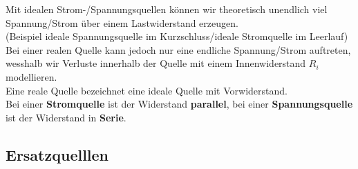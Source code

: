 										\iend


										Mit idealen Strom-/Spannungsquellen können wir theoretisch unendlich viel Spannung/Strom über einem Lastwiderstand erzeugen. \\
										(Beispiel ideale Spannungsquelle im Kurzschluss/ideale Stromquelle im Leerlauf) \\
										Bei einer realen Quelle kann jedoch nur eine endliche Spannung/Strom auftreten, wesshalb wir Verluste innerhalb der Quelle mit einem Innenwiderstand $R_i$ modellieren. \\

										\beginip
										Eine reale Quelle bezeichnet eine ideale Quelle mit Vorwiderstand. \\
										Bei einer \textbf{Stromquelle} ist der Widerstand \textbf{parallel}, bei einer \textbf{Spannungsquelle} ist der Widerstand in \textbf{Serie}.
											\begin{center}
												\fix
											\end{center}
										\iend






																				\subsection{Ersatzquelllen}


